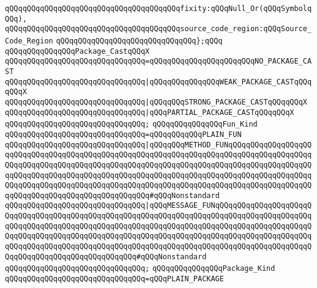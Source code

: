 \verb|qQQqqQQqqQQqqQQqqQQqqQQqqQQqqQQqqQQqqQQqfixity:qQQqNull_Or(qQQqSymbolqQQq),|\newline
\verb|qQQqqQQqqQQqqQQqqQQqqQQqqQQqqQQqqQQqqQQqsource_code_region:qQQqSource_Code_Region|\newline
\verb|qQQqqQQqqQQqqQQqqQQqqQQqqQQqqQQq};qQQq|\newline
\newline
\verb|qQQqqQQqqQQqqQQqPackage_CastqQQqX|\newline
\verb|qQQqqQQqqQQqqQQqqQQqqQQqqQQqqQQq=qQQqqQQqqQQqqQQqqQQqqQQqNO_PACKAGE_CAST|\newline
\verb|qQQqqQQqqQQqqQQqqQQqqQQqqQQqqQQq|\verb#|qQQqqQQqqQQqqQQqWEAK_PACKAGE_CASTqQQqqQQqX#\newline
\verb|qQQqqQQqqQQqqQQqqQQqqQQqqQQqqQQq|\verb#|qQQqqQQqSTRONG_PACKAGE_CASTqQQqqQQqX#\newline
\verb|qQQqqQQqqQQqqQQqqQQqqQQqqQQqqQQq|\verb#|qQQqPARTIAL_PACKAGE_CASTqQQqqQQqX#\newline
\verb|qQQqqQQqqQQqqQQqqQQqqQQqqQQqqQQq;|\newline
\newline
\verb|qQQqqQQqqQQqqQQqFun_Kind|\newline
\verb|qQQqqQQqqQQqqQQqqQQqqQQqqQQqqQQq=qQQqqQQqqQQqPLAIN_FUN|\newline
\verb|qQQqqQQqqQQqqQQqqQQqqQQqqQQqqQQq|\verb#|qQQqqQQqMETHOD_FUNqQQqqQQqqQQqqQQqqQQqqQQqqQQqqQQqqQQqqQQqqQQqqQQqqQQqqQQqqQQqqQQqqQQqqQQqqQQqqQQqqQQqqQQqqQQqqQQqqQQqqQQqqQQqqQQqqQQqqQQqqQQqqQQqqQQqqQQqqQQqqQQqqQQqqQQqqQQqqQQqqQQqqQQqqQQqqQQqqQQqqQQqqQQqqQQqqQQqqQQqqQQqqQQqqQQqqQQqqQQqqQQqqQQqqQQqqQQqqQQqqQQqqQQqqQQqqQQqqQQqqQQqqQQqqQQqqQQqqQQqqQQqqQQqqQQqqQQqqQQqqQQqqQQqqQQqqQQqqQQqqQQqqQQqqQQq#\verb|#qQQqNonstandard|\newline
\verb|qQQqqQQqqQQqqQQqqQQqqQQqqQQqqQQq|\verb#|qQQqMESSAGE_FUNqQQqqQQqqQQqqQQqqQQqqQQqqQQqqQQqqQQqqQQqqQQqqQQqqQQqqQQqqQQqqQQqqQQqqQQqqQQqqQQqqQQqqQQqqQQqqQQqqQQqqQQqqQQqqQQqqQQqqQQqqQQqqQQqqQQqqQQqqQQqqQQqqQQqqQQqqQQqqQQqqQQqqQQqqQQqqQQqqQQqqQQqqQQqqQQqqQQqqQQqqQQqqQQqqQQqqQQqqQQqqQQqqQQqqQQqqQQqqQQqqQQqqQQqqQQqqQQqqQQqqQQqqQQqqQQqqQQqqQQqqQQqqQQqqQQqqQQqqQQqqQQqqQQqqQQqqQQqqQQqqQQqqQQqqQQq#\verb|#qQQqNonstandard|\newline
\verb|qQQqqQQqqQQqqQQqqQQqqQQqqQQqqQQq;|\newline
\newline
\verb|qQQqqQQqqQQqqQQqPackage_Kind|\newline
\verb|qQQqqQQqqQQqqQQqqQQqqQQqqQQqqQQq=qQQqPLAIN_PACKAGE|\newline
